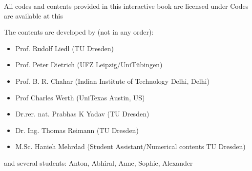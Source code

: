 \documentclass[letterpaper,10pt,english]{jupyterBook}
\begin{document}
\sphinxAtStartPar
All codes and contents provided in this interactive book are licensed under 
Codes are available at this 
\begin{quote}

\sphinxAtStartPar
{}
\end{quote}

\begin{DUlineblock}{0em}
\item[] 
\end{DUlineblock}

\sphinxAtStartPar
The contents are developed by (not in any order):
\begin{itemize}
\item {} 
\sphinxAtStartPar
Prof. Rudolf Liedl (TU Dresden)

\item {} 
\sphinxAtStartPar
Prof. Peter Dietrich (UFZ Leipzig/Uni\sphinxhyphen{}Tübingen)

\item {} 
\sphinxAtStartPar
Prof. B. R. Chahar (Indian Institute of Technology Delhi, Delhi)

\item {} 
\sphinxAtStartPar
Prof Charles Werth (Uni\sphinxhyphen{}Texas Austin, US)

\item {} 
\sphinxAtStartPar
Dr.rer. nat. Prabhas K Yadav (TU Dresden)

\item {} 
\sphinxAtStartPar
Dr. Ing. Thomas Reimann (TU Dresden)

\item {} 
\sphinxAtStartPar
M.Sc. Hanieh Mehrdad (Student Assistant/Numerical contents\sphinxhyphen{} TU Dresden)

\end{itemize}

\sphinxAtStartPar
and several students: Anton, Abhiral, Anne, Sophie, Alexander

\begin{DUlineblock}{0em}
\item[] 
\end{DUlineblock}
\end{document}
